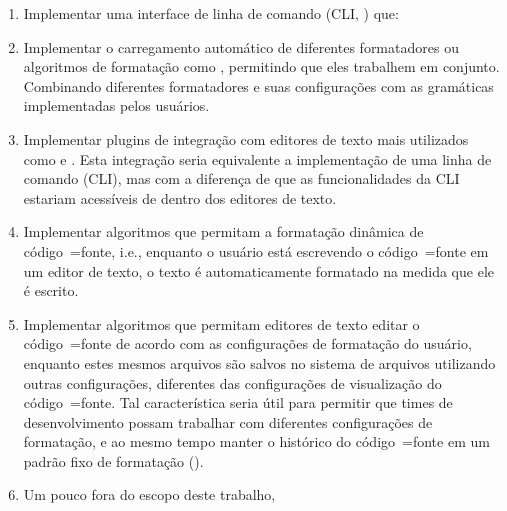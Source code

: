 \begin{enumerate}
\item Implementar uma interface de linha de comando (CLI, ) que:
%
\item Implementar o carregamento automático de diferentes formatadores ou
algoritmos de formatação como ,
permitindo que eles trabalhem em conjunto.
Combinando diferentes formatadores e
suas configurações com as gramáticas implementadas pelos usuários.
\item Implementar plugins de integração com editores de texto mais utilizados como  e
.
Esta integração seria equivalente a implementação de uma linha de comando (CLI),
mas com a diferença de que as funcionalidades da CLI estariam acessíveis de dentro dos editores de texto.
\item Implementar algoritmos que permitam a formatação dinâmica de código~=fonte,
i.e.,
enquanto o usuário está escrevendo o código~=fonte em um editor de texto,
o texto é automaticamente formatado na medida que ele é escrito.
\item Implementar algoritmos que permitam editores de texto editar o código~=fonte de acordo com as configurações de formatação do usuário,
enquanto estes mesmos arquivos são salvos no sistema de arquivos utilizando outras configurações,
diferentes das configurações de visualização do código~=fonte.
Tal característica seria útil para permitir que times de desenvolvimento possam trabalhar com diferentes configurações de formatação,
e ao mesmo tempo manter o histórico do código~=fonte em um padrão fixo de formatação ().
\item Um pouco fora do escopo deste trabalho,

\end{enumerate}
